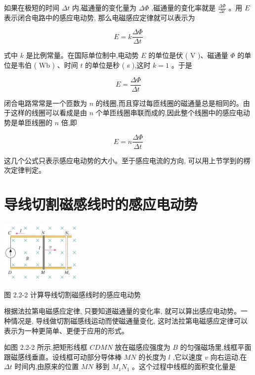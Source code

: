 \documentclass[10pt]{article}
\begin{document}
如果在极短的时间 \({\Delta t}\) 内,磁通量的变化量为 \({\Delta \Phi }\) ,磁通量的变化率就是 \(\frac{\Delta \Phi }{\Delta t}\) 。用 \(E\) 表示闭合电路中的感应电动势, 那么电磁感应定律就可以表示为

\[
E = k\frac{\Delta \Phi }{\Delta t}
\]

式中 \(k\) 是比例常量。在国际单位制中,电动势 \(E\) 的单位是伏 ( V )、磁通量 \(\Phi\) 的单位是韦伯 ( Wb ) 、时间 \(t\) 的单位是秒 ( s ),这时 \(k = 1\) 。于是

\[
E = \frac{\Delta \Phi }{\Delta t} \tag{1}
\]

闭合电路常常是一个匝数为 \(n\) 的线圈,而且穿过每匝线圈的磁通量总是相同的。由于这样的线圈可以看成是由 \(n\) 个单匝线圈串联而成的,因此整个线圈中的感应电动势是单匝线圈的 \(n\) 倍,即

\[
E = n\frac{\Delta \Phi }{\Delta t} \tag{2}
\]

\begin{mdframed}

这几个公式只表示感应电动势的大小。至于感应电流的方向, 可以用上节学到的楞次定律判定。

\end{mdframed}

\section*{导线切割磁感线时的感应电动势}

\begin{center}
\includegraphics[max width=0.3\textwidth]{images/01910e72-c5b7-7ed5-a6d4-fb3a5faefc32_36_708283.jpg}
\end{center}

图 2.2-2 计算导线切割磁感线时的感应电动势

根据法拉第电磁感应定律, 只要知道磁通量的变化率, 就可以算出感应电动势。一种情况是, 导线做切割磁感线运动而使磁通量变化, 这时法拉第电磁感应定律可以表示为一种更简单、更便于应用的形式。

如图 2.2-2 所示,把矩形线框 \({CDMN}\) 放在磁感应强度为 \(B\) 的匀强磁场里,线框平面跟磁感线垂直。设线框可动部分导体棒 \({MN}\) 的长度为 \(l\) ,它以速度 \(v\) 向右运动,在 \({\Delta t}\) 时间内,由原来的位置 \({MN}\) 移到 \({M}_{1}{N}_{1}\) 。这个过程中线框的面积变化量是
\end{document}
